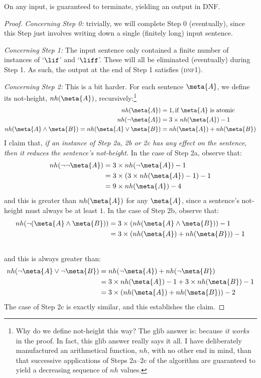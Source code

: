 \begin{lem}\label{lem:IntoDNFHalts}
	On any input, \intoDNF{} is guaranteed to terminate, yielding an output in DNF.
	\begin{proof}
		\emph{Concerning Step 0:} trivially, we will complete Step 0 (eventually), since this Step just involves writing down a single (finitely long) input sentence.
		
		\emph{Concerning Step 1:} The input sentence only contained a finite number of instances of `$\lif$' and `$\liff$'. These will all be eliminated (eventually) during Step 1. As such, the output at the end of Step 1 satisfies (\textsc{dnf1}). 
		
		\emph{Concerning Step 2:} This is a bit harder. For each sentence $\meta{A}$, we define its not-height, $nh(\meta{A})$, recursively:\footnote{Why do we define not-height this way? The glib answer is: because \emph{it works} in the proof. In fact, this glib answer really says it all. I have deliberately manufactured an arithmetical function, $nh$, with no other end in mind, than that successive applications of Steps 2a--2c of the algorithm are guaranteed to yield a decreasing sequence of $nh$ values.}
			\begin{align*}
				nh(\meta{A}) &= 1, \text{if }\meta{A}\text{ is atomic}\\
				nh(\lnot \meta{A}) &= 3\times{nh(\meta{A})} - 1\\
				nh(\meta{A} \land \meta{B}) = nh(\meta{A} \lor \meta{B}) &= nh(\meta{A}) + nh(\meta{B})
			\end{align*}
		I claim that, \emph{if an instance of Step 2a, 2b or 2c has any effect on the sentence, then it reduces the sentence's not-height.} In the case of Step 2a, observe that:
		\begin{align*}
		nh(\lnot\lnot\meta{A}) &= 3 \times nh(\lnot\meta{A}) -1 \\
		&= 3\times(3 \times nh(\meta{A})-1) -1 \\
		& = 9\times nh(\meta{A}) - 4
		\end{align*}
		and this is greater than $nh(\meta{A})$ for any $\meta{A}$, since a sentence's not-height must always be at least $1$. In the case of Step 2b, observe that:
	\begin{align*}
				nh(\lnot(\meta{A} \land \meta{B})) &= 3\times (nh(\meta{A} \land \meta{B})) -1 \\
				&= 3 \times(nh(\meta{A}) + nh(\meta{B})) - 1\\\
			\end{align*}
		and this is always greater than:
		\begin{align*}
		nh(\lnot\meta{A} \lor \lnot \meta{B}) &= nh(\lnot \meta{A}) + nh(\lnot\meta{B})\\
		&= 3\times nh(\meta{A}) -1 + 3 \times nh(\meta{B}) - 1\\
		&= 3\times(nh(\meta{A}) + nh(\meta{B})) - 2
		\end{align*}
		The case of Step 2c is exactly similar, and this establishes the claim. 
		

\end{proof}
\end{lem}
